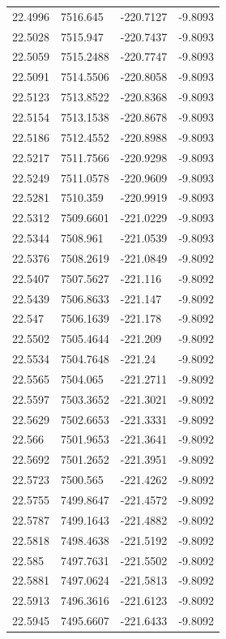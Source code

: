 \begin{table}[H]
\begin{tabular}{llll}
22.4996 & 7516.645 & -220.7127 & -9.8093 \\
22.5028 & 7515.947 & -220.7437 & -9.8093 \\
22.5059 & 7515.2488 & -220.7747 & -9.8093 \\
22.5091 & 7514.5506 & -220.8058 & -9.8093 \\
22.5123 & 7513.8522 & -220.8368 & -9.8093 \\
22.5154 & 7513.1538 & -220.8678 & -9.8093 \\
22.5186 & 7512.4552 & -220.8988 & -9.8093 \\
22.5217 & 7511.7566 & -220.9298 & -9.8093 \\
22.5249 & 7511.0578 & -220.9609 & -9.8093 \\
22.5281 & 7510.359 & -220.9919 & -9.8093 \\
22.5312 & 7509.6601 & -221.0229 & -9.8093 \\
22.5344 & 7508.961 & -221.0539 & -9.8093 \\
22.5376 & 7508.2619 & -221.0849 & -9.8092 \\
22.5407 & 7507.5627 & -221.116 & -9.8092 \\
22.5439 & 7506.8633 & -221.147 & -9.8092 \\
22.547 & 7506.1639 & -221.178 & -9.8092 \\
22.5502 & 7505.4644 & -221.209 & -9.8092 \\
22.5534 & 7504.7648 & -221.24 & -9.8092 \\
22.5565 & 7504.065 & -221.2711 & -9.8092 \\
22.5597 & 7503.3652 & -221.3021 & -9.8092 \\
22.5629 & 7502.6653 & -221.3331 & -9.8092 \\
22.566 & 7501.9653 & -221.3641 & -9.8092 \\
22.5692 & 7501.2652 & -221.3951 & -9.8092 \\
22.5723 & 7500.565 & -221.4262 & -9.8092 \\
22.5755 & 7499.8647 & -221.4572 & -9.8092 \\
22.5787 & 7499.1643 & -221.4882 & -9.8092 \\
22.5818 & 7498.4638 & -221.5192 & -9.8092 \\
22.585 & 7497.7631 & -221.5502 & -9.8092 \\
22.5881 & 7497.0624 & -221.5813 & -9.8092 \\
22.5913 & 7496.3616 & -221.6123 & -9.8092 \\
22.5945 & 7495.6607 & -221.6433 & -9.8092 \\

\end{tabular}
\end{table}

